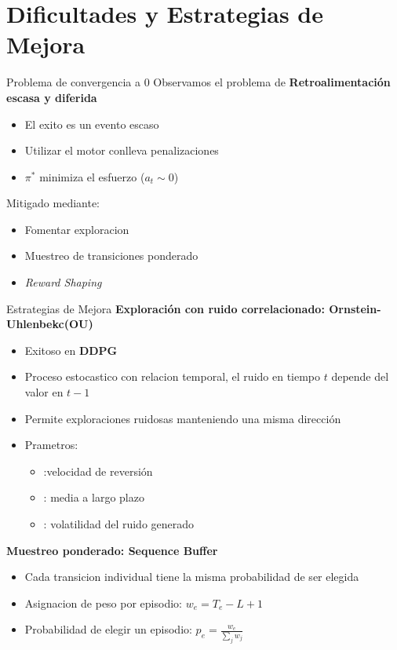 \section{Dificultades y Estrategias de Mejora}

\begin{frame}{Problema de convergencia a 0}
    Observamos el problema de \textbf{Retroalimentación escasa y diferida}
    \vspace{0.2cm}
    \begin{itemize}
        \item El exito es un evento escaso
        \item Utilizar el motor conlleva penalizaciones
        \item $\pi^\ast$ \rightarrow minimiza el esfuerzo ($a_t \sim 0$)     
    \end{itemize}
    Mitigado mediante:
    \begin{itemize}
        \item Fomentar exploracion
        \item Muestreo de transiciones ponderado
        \item \textit{Reward Shaping}
    \end{itemize}
\end{frame}

\begin{frame}{Estrategias de Mejora}
    \textbf{Exploración con ruido correlacionado: Ornstein-Uhlenbekc(OU)}
    \begin{itemize}
        \item Exitoso en \textbf{DDPG}
        \item Proceso estocastico con relacion temporal, el ruido en tiempo $t$ depende del valor en $t-1$
        \item Permite exploraciones ruidosas manteniendo una misma dirección
        \item Prametros:
            \begin{itemize}
                \item \Theta :velocidad de reversión
                \item \mu : media a largo plazo
                \item \sigma : volatilidad del ruido generado 
            \end{itemize}
    \end{itemize}

    \textbf{Muestreo ponderado: Sequence Buffer}
    \begin{itemize}
        \item Cada transicion individual tiene la misma probabilidad de ser elegida
        \item Asignacion de peso por episodio: $w_e = T_e - L + 1$
        \item Probabilidad de elegir un episodio: $p_e = \frac{w_e}{\sum_j{w_j}}$
    \end{itemize}
\end{frame}

